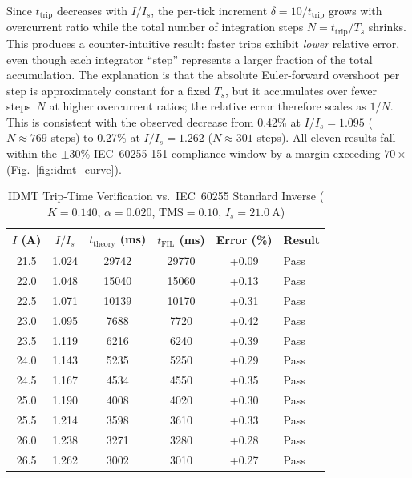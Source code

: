 \documentclass[conference]{IEEEtran}
\begin{document}
\noindent
Since $t_{\text{trip}}$ decreases with $I/I_s$, the per-tick
increment $\delta = 10/t_{\text{trip}}$ grows with overcurrent ratio
while the total number of integration steps $N = t_{\text{trip}}/T_s$
shrinks.  This produces a counter-intuitive result: faster trips
exhibit \emph{lower} relative error, even though each integrator
``step'' represents a larger fraction of the total accumulation.
The explanation is that the absolute Euler-forward overshoot per step
is approximately constant for a fixed $T_s$, but it accumulates over
fewer steps~$N$ at higher overcurrent ratios; the relative error
therefore scales as $1/N$.  This is consistent with the observed
decrease from 0.42\% at $I/I_s = 1.095$ ($N \approx 769$ steps) to
0.27\% at $I/I_s = 1.262$ ($N \approx 301$ steps).  All eleven
results fall within the $\pm$30\% IEC~60255-151 compliance window
\cite{iec60255} by a margin exceeding $70{\times}$
(Fig.~\ref{fig:idmt_curve}).

\begin{table}[t]
  \caption{IDMT Trip-Time Verification vs.\ IEC~60255 Standard Inverse
           ($K=0.140$, $\alpha=0.020$, TMS$=0.10$, $I_s=\SI{21.0}{\ampere}$)}
  \label{tab:idmt_results}
  \centering
  \begin{tabular}{S[table-format=2.1]
                  S[table-format=1.3]
                  S[table-format=5.0]
                  S[table-format=5.0]
                  S[table-format=+1.2]
                  l}
    \toprule
    {$I$ (\si{\ampere})}
      & {$I/I_s$}
      & {$t_{\text{theory}}$ (\si{ms})}
      & {$t_{\text{FIL}}$ (\si{ms})}
      & {Error (\%)}
      & {Result} \\
     & 1.024 & 29742 & 29770 & +0.09 & Pass \\
    22.0 & 1.048 & 15040 & 15060 & +0.13 & Pass \\
    22.5 & 1.071 & 10139 & 10170 & +0.31 & Pass \\
    23.0 & 1.095 &  7688 &  7720 & +0.42 & Pass \\
    23.5 & 1.119 &  6216 &  6240 & +0.39 & Pass \\
    24.0 & 1.143 &  5235 &  5250 & +0.29 & Pass \\
    24.5 & 1.167 &  4534 &  4550 & +0.35 & Pass \\
    25.0 & 1.190 &  4008 &  4020 & +0.30 & Pass \\
    25.5 & 1.214 &  3598 &  3610 & +0.33 & Pass \\
    26.0 & 1.238 &  3271 &  3280 & +0.28 & Pass \\
    26.5 & 1.262 &  3002 &  3010 & +0.27 & Pass \\
    \bottomrule
  \end{tabular}
\end{table}
\end{document}
